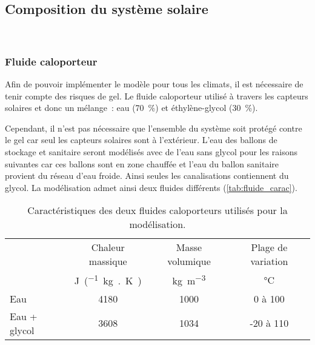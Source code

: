 \subsection{Composition du système solaire} %
\label{sub:composition_du_système_solaire}
~


\subsubsection{Fluide caloporteur} %
\label{ssub:fluide_caloporteur}
Afin de pouvoir implémenter le modèle pour tous les climats, il est nécessaire de
tenir compte des risques de gel. Le fluide caloporteur utilisé à travers les capteurs
solaires et donc un mélange~: eau (\SI{70}{\percent}) et éthylène-glycol (\SI{30}{\percent}).

Cependant, il n’est pas nécessaire que l’ensemble du système soit protégé contre
le gel car seul les capteurs solaires sont à l’extérieur. L’eau des ballons de stockage
et sanitaire seront modélisés avec de l’eau sans glycol pour les raisons suivantes car
ces ballons sont en zone chauffée et l’eau du ballon sanitaire provient du réseau
d’eau froide. Ainsi seules les canalisations contiennent du glycol.
La modélisation admet ainsi deux fluides différents (\autoref{tab:fluide_carac}).

\begin{table}
\centering
\begin{tabular}{l*{3}{c}}
    \toprule
                 & Chaleur massique              & Masse volumique         & Plage de variation \\
                 & \si{\joule\per(kg{.}\kelvin)} & \si{kg\per\meter\cubed} & \si{\celsius}      \\
    \midrule
    Eau          & 4180                          & 1000                    & 0 à 100            \\
    Eau + glycol & 3608                          & 1034                    & -20 à 110          \\
    \bottomrule
\end{tabular}
\caption{Caractéristiques des deux fluides caloporteurs utilisés pour la modélisation.}
         \label{tab:fluide_carac}
\end{table}

